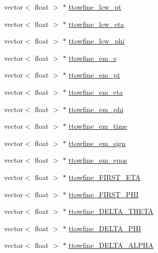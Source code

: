 \begin{DoxyCompactItemize}
\item 
vector$<$ float $>$ $\ast$ \hyperlink{classCollectionTree_aff3c0b5a2559c488eb23d95634ee4b43}{ttowfine\+\_\+lcw\+\_\+pt}
\item 
vector$<$ float $>$ $\ast$ \hyperlink{classCollectionTree_ad1b7a653373be289f54ed5fdef463277}{ttowfine\+\_\+lcw\+\_\+eta}
\item 
vector$<$ float $>$ $\ast$ \hyperlink{classCollectionTree_ac38b3e5bab63f527a275d3946382e1d4}{ttowfine\+\_\+lcw\+\_\+phi}
\item 
vector$<$ float $>$ $\ast$ \hyperlink{classCollectionTree_ad48d6ebb7b4d4137c5b557b13c12d97b}{ttowfine\+\_\+em\+\_\+e}
\item 
vector$<$ float $>$ $\ast$ \hyperlink{classCollectionTree_af4525114e1419de0edc59237c4800e3c}{ttowfine\+\_\+em\+\_\+pt}
\item 
vector$<$ float $>$ $\ast$ \hyperlink{classCollectionTree_ad0c9e38bca01b11d2c2f7f2aa4e1da46}{ttowfine\+\_\+em\+\_\+eta}
\item 
vector$<$ float $>$ $\ast$ \hyperlink{classCollectionTree_ad55463c83998c15e06e3dbd6366db703}{ttowfine\+\_\+em\+\_\+phi}
\item 
vector$<$ float $>$ $\ast$ \hyperlink{classCollectionTree_a686fd85764d40fcab4cedea8b8fb34e0}{ttowfine\+\_\+em\+\_\+time}
\item 
vector$<$ float $>$ $\ast$ \hyperlink{classCollectionTree_ab2cd699a3a04f6018783bd5e01ef4ce8}{ttowfine\+\_\+em\+\_\+sign}
\item 
vector$<$ float $>$ $\ast$ \hyperlink{classCollectionTree_af03b3696f4f39be155e28c4ae532d6e6}{ttowfine\+\_\+em\+\_\+epos}
\item 
vector$<$ float $>$ $\ast$ \hyperlink{classCollectionTree_a1eb6e0131435fa93a01d68cc084cc195}{ttowfine\+\_\+\+F\+I\+R\+S\+T\+\_\+\+E\+TA}
\item 
vector$<$ float $>$ $\ast$ \hyperlink{classCollectionTree_adfa66e9daae66b89b28740f1c9da8ebd}{ttowfine\+\_\+\+F\+I\+R\+S\+T\+\_\+\+P\+HI}
\item 
vector$<$ float $>$ $\ast$ \hyperlink{classCollectionTree_a4f9a754ebc91ab3d5022405e8dc26f26}{ttowfine\+\_\+\+D\+E\+L\+T\+A\+\_\+\+T\+H\+E\+TA}
\item 
vector$<$ float $>$ $\ast$ \hyperlink{classCollectionTree_a3379136801e215a10e5f4f88085d04f1}{ttowfine\+\_\+\+D\+E\+L\+T\+A\+\_\+\+P\+HI}
\item 
vector$<$ float $>$ $\ast$ \hyperlink{classCollectionTree_a433c15af5c0c39d815221c2ba0350959}{ttowfine\+\_\+\+D\+E\+L\+T\+A\+\_\+\+A\+L\+P\+HA}

\end{DoxyCompactItemize}
